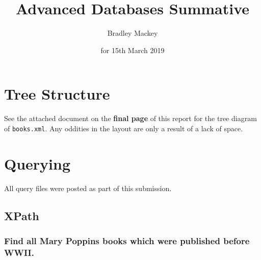 \documentclass[11pt]{article}
\begin{document}
\title{\textbf{Advanced Databases Summative}}
\date{for 15th March 2019}
\author{Bradley Mackey}
\maketitle

\section{Tree Structure}

See the attached document on the \textbf{final page} of this report for the tree diagram of \texttt{books.xml}. Any oddities in the layout are only a result of a lack of space.

\section{Querying}

All query files were posted as part of this submission.

\subsection{XPath}

\subsubsection{Find all Mary Poppins books which were published before WWII.}
\end{document}
